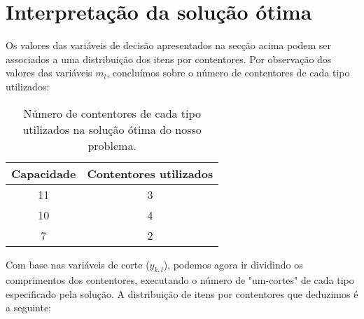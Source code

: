 \documentclass[12pt, a4paper, titlepage]{article}
\begin{document}
\section{Interpretação da solução ótima}

Os valores das variáveis de decisão apresentados na secção acima podem ser associados a uma
distribuição dos itens por contentores. Por observação dos valores das variáveis $m_l$, concluímos
sobre o número de contentores de cada tipo utilizados:

\begin{table}[H]
    \begin{center}
        \begin{tabular}{c|c}
            Capacidade & Contentores utilizados \\
            \hline
            11         & 3 \\
            10         & 4 \\
            7          & 2
        \end{tabular}
    \end{center}
    \caption{Número de contentores de cada tipo utilizados na solução ótima do nosso problema.}
\end{table}

Com base nas variáveis de corte ($y_{k, l}$), podemos agora ir dividindo os comprimentos dos
contentores, executando o número de "um-cortes"{} de cada tipo especificado pela solução. A
distribuição de itens por contentores que deduzimos é a seguinte:

\bgroup
\renewcommand{\arraystretch}{0}
\end{document}

